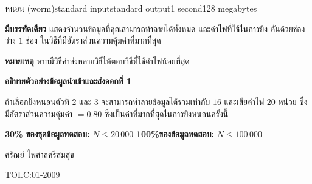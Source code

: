 \documentclass[11pt,a4paper]{article}
\begin{document}
\begin{problem}{หนอน (worm)}{standard input}{standard output}{1 second}{128 megabytes}
\OutputFile

\textbf{มีบรรทัดเดียว} แสดงจำนวนข้อมูลที่คุณสามารถทำลายได้ทั้งหมด และค่าไฟที่ใช้ในการยิง คั่นด้วยช่องว่าง $1$ ช่อง ในวิธีที่มีอัตราส่วนความคุ้มค่าที่มากที่สุด

\textbf{หมายเหตุ} หากมีวิธีค่าส่งหลายวิธีให้ตอบวิธีที่ใช้ค่าไฟน้อยที่สุด

\Examples

\begin{example}
%
\end{example}

\Note 

\textbf{อธิบายตัวอย่างข้อมูลนำเข้าและส่งออกที่ 1}

ถ้าเลือกยิงหนอนตัวที่ $2$ และ $3$ จะสามารถทำลายข้อมูลได้รวมเท่ากับ $16$ และเสียค่าไฟ $20$ หน่วย ซึ่งมีอัตราส่วนความคุ้มค่า $= 0.80$ ซึ่งเป็นค่าที่มากที่สุดในการยิงหนอนครั้งนี้

\Scoring

\textbf{30\% ของชุดข้อมูลทดสอบ:} $ N \leq 20\,000$ 
\textbf{100\%ของข้อมูลทดสอบ:} $N \leq 100\,000$
\Source

ศรัณย์ ไพศาลศรีสมสุข 

\underline{\href{http://thailandoi.org/toi.c/01-2009}{TOI.C:01-2009}}


\end{problem}
\end{document}
